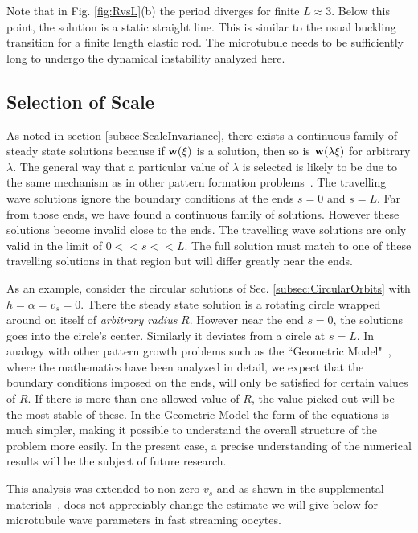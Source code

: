 \documentclass[11pt]{ucthesis}
\def\bw{{\bf w}}
\begin{document}
{Note that in Fig. \ref{fig:RvsL}(b) the period diverges for finite $L \approx 3$. Below this
point, the solution is a static straight line. This is similar to the usual buckling transition
for a finite length elastic rod. The microtubule needs to be sufficiently long to undergo
the dynamical instability analyzed here. 


\subsection{Selection of Scale}

As noted in section \ref{subsec:ScaleInvariance}, there exists
a continuous family of steady state solutions because  if
$\bw(\xi)$ is a solution, then so is $\bw(\lambda \xi)$ for arbitrary
$\lambda$. The general way that a particular value of $\lambda$ is selected
is likely to be due to the same mechanism as in other pattern formation
problems~\cite{Kessler,Barbieri}. The travelling wave solutions ignore the
boundary conditions at the ends $s=0$ and $s=L$.  Far from those ends,
we have found a continuous family of solutions. However these solutions
become invalid close to the ends.  The travelling wave solutions are
only valid in the limit of $0 << s << L$. The full solution must match
to one of these travelling solutions in that region but will differ
greatly near the ends.

As an example, consider the circular solutions of
Sec. \ref{subsec:CircularOrbits} with $h = \alpha = v_s = 0$. There the
steady state solution is a rotating circle wrapped around on itself of
{\em arbitrary radius} $R$.  However near the end $s=0$, the solutions
goes into the circle's center. Similarly it deviates from a circle
at $s=L$.  In analogy with other pattern growth problems such as the
``Geometric Model"~\cite{Kessler},  where the mathematics have been analyzed
in detail, we expect that the boundary conditions imposed on the ends,
will only be satisfied for certain values of $R$. If there is more than
one allowed value of $R$, the value picked out will be the most stable of
these. In the Geometric Model the form of the equations is much simpler,
making it possible to understand the overall structure of the problem
more easily. In the present case, a precise understanding of the numerical
results will be the subject of future research.


This analysis was extended to non-zero $v_s$ and as shown in the supplemental materials~\cite{SupplMat}, does not
appreciably change the estimate we will give below for microtubule wave parameters in fast streaming oocytes. 


}
\end{document}

